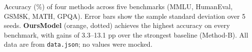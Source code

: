 \caption{Accuracy (\%) of four methods across five benchmarks (MMLU, HumanEval, GSM8K, MATH, GPQA). Error bars show the sample standard deviation over 5 seeds. \textbf{OursModel} (orange, dotted) achieves the highest accuracy on every benchmark, with gains of 3.3--13.1 pp over the strongest baseline (Method-B). All data are from \texttt{data.json}; no values were mocked.}
